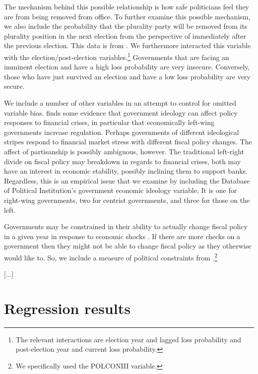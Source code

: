 \documentclass[]{article}
\begin{document}
The mechanism behind this possible relationship is how safe politicians feel they are from being removed from office. To further examine this possible mechanism, we also include the probability that the plurality party will be removed from its plurality position in the next election from the perspective of immediately after the previous election. This data is from \cite{Kayser2015comp}. We furthermore interacted this variable with the election/post-election variables.\footnote{The relevant interactions are election year and lagged loss probability and post-election year and current loss probability.} Governments that are facing an imminent election and have a high loss probability are very insecure. Conversely, those who have just survived an election and have a low loss probability are very secure.

We include a number of other variables in an attempt to control for omitted variable bias. \cite{broz2013} finds some evidence that government ideology can affect policy responses to financial crises, in particular that economically left-wing governments increase regulation. Perhaps governments of different ideological stripes respond to financial market stress with different fiscal policy changes. The affect of partisanship is possibly ambiguous, however. The traditional left-right divide on fiscal policy may breakdown in regards to financial crises, both may have an interest in economic stability, possibly inclining them to support banks. Regardless, this is an empirical issue that we examine by including the Database of Political Institution's \citep[][updated through 2012]{DPI2001} government economic ideology variable. It is one for right-wing governments, two for centrist governments, and three for those on the left.

Governments may be constrained in their ability to actually change fiscal policy in a given year in response to economic shocks \cite[e.g.][]{MacIntyre2001}. If there are more checks on a government then they might not be able to change fiscal policy as they otherwise would like to. So, we include a measure of political constraints from \cite[][updated through 2011]{Henisz2004}.\footnote{We specifically used the POLCONIII variable.}

[...]

\section{Regression results}
\end{document}
